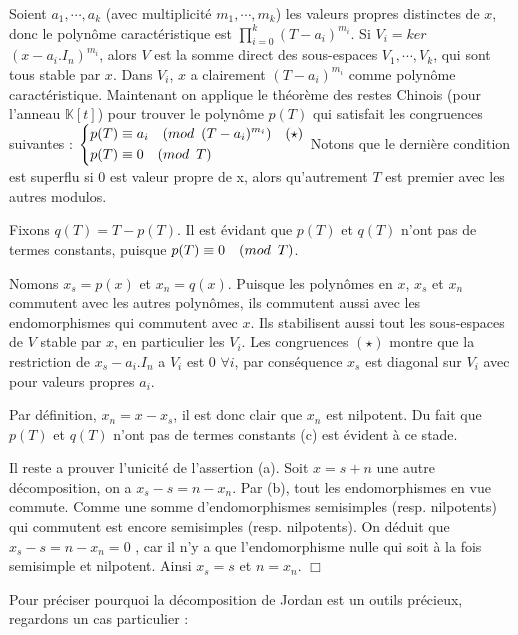 \documentclass[a4paper,openany,12pt]{report}
\newcommand{\KK}{\mathbb{K}}
\theoremstyle{break}
{\theorembodyfont{\upshape}
\newtheorem*{rmq}{Remarque :}
\newtheorem*{prv}{Preuve :}
\newtheorem*{ex}{Exemples :}
\newtheorem*{exe}{Exemple : }
\newtheorem*{nota}{Notation :}
\newtheorem*{dem}{D\'emonstration :}}
\begin{document}
\begin{prv}
\quad Soient $a_{1},\cdots,a_{k}$ (avec multiplicité $m_{1},\cdots,m_{k}$) les valeurs propres distinctes de $x$, donc le polynôme caractéristique est $\prod\limits_{i=0}^k  \left( T-a_{i} \right)^{m_{i}}$. Si $V_{i}=ker$ $(x-a_{i}.I_{n})^{m_{i}}$, alors $V$ est la somme direct des sous-espaces $V_{1}, \cdots, V_{k}$, qui sont tous stable par $x$. Dans $V_{i}$, $x$ a clairement $(T-a_{i})^{m_{i}}$ comme polynôme caractéristique.
\quad Maintenant on applique le théorème des restes Chinois (pour l'anneau $\KK [t]$) pour trouver le polynôme $p(T)$ qui satisfait les congruences suivantes :
$
\left\{
\begin{aligned}
p(T) & \equiv a_{i} \quad (mod \enskip (T-a_{i})^{m_{i}}) \quad (\star) \\
p(T) & \equiv 0 \quad (mod \enskip T)
\end{aligned}
\right. $
Notons que le dernière condition est superflu si 0 est valeur propre de x, alors qu'autrement $T$ est premier avec les autres modulos. 

Fixons $q(T)=T-p(T)$. Il est évidant que $p(T)$ et $q(T)$ n'ont pas de termes constants, puisque $p(T) \equiv 0 \quad (mod \enskip T)$.

Nomons $x_{s} = p(x)$ et $x_{n} = q(x)$. Puisque les polynômes en $x$, $x_{s}$ et $x_{n}$ commutent avec les autres polynômes, ils commutent aussi avec les endomorphismes qui commutent avec $x$. Ils stabilisent aussi tout les sous-espaces de $V$ stable par $x$, en particulier les $V_{i}$. Les congruences $(\star)$ montre que la restriction de $x_{s}-a_{i}.I_{n}$ a $V_{i}$ est 0 $\forall i$, par conséquence $x_{s}$ est diagonal sur $V_{i}$ avec pour valeurs propres $a_{i}$.

Par définition, $x_{n} = x - x_{s}$, il est donc clair que $x_{n}$ est nilpotent. Du fait que $p(T)$ et $q(T)$ n'ont pas de termes constants (c) est évident à ce stade. 

Il reste a prouver l'unicité de l'assertion (a). Soit $x=s+n$ une autre décomposition, on a $x_{s}-s=n-x_{n}$. Par (b), tout les endomorphismes en vue commute. Comme une somme d'endomorphismes semisimples (resp. nilpotents) qui commutent est encore semisimples (resp. nilpotents). On déduit que $x_{s}-s=n-x_{n}=0$ , car il n'y a que l'endomorphisme nulle qui soit à la fois semisimple et nilpotent. Ainsi $x_{s}=s$ et $n =x_{n}$. $\Box$
\end{prv}

Pour préciser pourquoi la décomposition de Jordan est un outils précieux, regardons un cas particulier :
\end{document}
